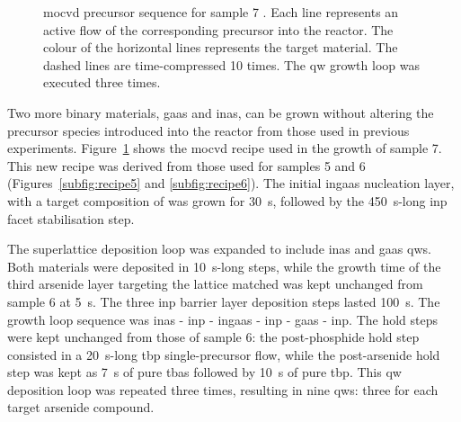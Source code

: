 \begin{figure}
    \caption[\acs{mocvd} precursor sequence for sample 7.]{\acs{mocvd} precursor sequence for sample 7 \cite{Brugnolotto2023_2}. Each line represents an active flow of the corresponding precursor into the reactor. The colour of the horizontal lines represents the target material. The dashed lines are time-compressed \num{10} times. The \acl{qw} growth loop was executed three times.}
    \label{subfig:recipe7}
\end{figure}


Two more binary materials, \acf{gaas} and \acf{inas}, can be grown without altering the precursor species introduced into the reactor from those used in previous experiments. Figure~\ref{subfig:recipe7} shows the \acs{mocvd} recipe used in the growth of sample 7. This new recipe was derived from those used for samples 5 and 6 (Figures~\ref{subfig:recipe5} and \ref{subfig:recipe6}). The initial \acs{ingaas} nucleation layer, with a target composition of  was grown for \qty{30}{\second}, followed by the \qty{450}{\second}-long \acs{inp}  facet stabilisation step.

The superlattice deposition loop was expanded to include \acs{inas} and \acs{gaas} \acl{qw}s. Both materials were deposited in \qty{10}{\second}-long steps, while the growth time of the third arsenide layer targeting the lattice matched  was kept unchanged from sample 6 at \qty{5}{\second}. The three \acs{inp} barrier layer deposition steps lasted \qty{100}{\second}. The growth loop sequence was \acs{inas} - \acs{inp} - \acs{ingaas} - \acs{inp} - \acs{gaas} - \acs{inp}. The hold steps were kept unchanged from those of sample 6: the post-phosphide hold step consisted in a \qty{20}{\second}-long \acf{tbp} single-precursor flow, while the post-arsenide hold step was kept as \qty{7}{\second} of pure \acf{tbas} followed by \qty{10}{\second} of pure \acs{tbp}. This \acl{qw} deposition loop was repeated three times, resulting in nine \acl{qw}s: three for each target arsenide compound.

